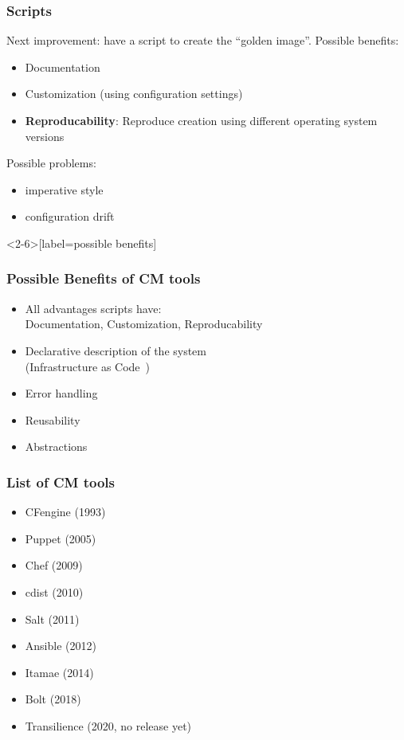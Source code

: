 \begin{frame}
	\frametitle{Scripts}

	Next improvement: have a script to create the ``golden image''.
	Possible benefits:

	\begin{itemize}[<+-| alert@+>]
	\item Documentation
	\item Customization (using configuration settings)
	\item \textbf{Reproducability}: Reproduce creation using different operating system versions
	\end{itemize}

	\pause[\thebeamerpauses]
	\vspace{1cm}
	Possible problems:

	\begin{itemize}[<+-| alert@+>]
	\item imperative style
	\item configuration drift
	\end{itemize}
\end{frame}

\begin{frame}<2-6>[label=possible benefits]
	\frametitle{Possible Benefits of CM tools}

	\pause

	\begin{itemize}[<+-| alert@+>]
	\item All advantages scripts have: \\
		Documentation, Customization, Reproducability
	\item Declarative description of the system \\
		(Infrastructure as Code~\cite{waldemar2013testing})
	\item Error handling
	\item Reusability
	\item Abstractions
	\end{itemize}
\end{frame}

\begin{frame}
	\frametitle{List of CM tools}

	\begin{itemize}[<+-| alert@+>]
	\item CFengine (1993)
	\item Puppet (2005)
	\item Chef (2009)
	\item cdist (2010) %
	\item Salt (2011)
	\item Ansible (2012)
	\item Itamae (2014)
	\item Bolt (2018) %
	\item Transilience (2020, no release yet) %
	\end{itemize}
\end{frame}

